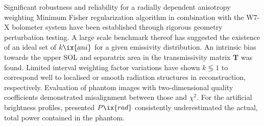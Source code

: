         Significant robustness and reliability for a radially dependent anisotropy weighting Minimum Fisher regularization algorithm in combination with the W7-X bolometer system have been established through rigorous geometry perturbation testing. A large scale benchmark thereof has suggested the existence of an ideal set of $k\ix{ani}$ for a given emissivity distribution. An intrinsic bias towards the upper SOL and separatrix area in the transmissivity matrix $\mathbf{T}$ was found. Limited interval weighting factor variations have shown $k\lessgtr1$ to correspond well to localised or smooth radiation structures in reconstruction, respectively. Evaluation of phantom images with two-dimensional quality coefficients demonstrated misalignment between those and $\chi^{2}$. For the artificial brightness profiles, presented $P\ix{rad}$ consistently underestimated the actual, total power contained in the phantom.%
%
